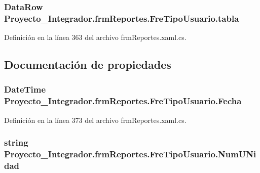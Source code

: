 \subsubsection[{tabla}]{\setlength{\rightskip}{0pt plus 5cm}Data\-Row Proyecto\-\_\-\-Integrador.\-frm\-Reportes.\-Fre\-Tipo\-Usuario.\-tabla}\label{struct_proyecto___integrador_1_1frm_reportes_1_1_fre_tipo_usuario_a0bc2763503284cfde519abe7c04de714}


Definición en la línea 363 del archivo frm\-Reportes.\-xaml.\-cs.



\subsection{Documentación de propiedades}
\subsubsection[{Fecha}]{\setlength{\rightskip}{0pt plus 5cm}Date\-Time Proyecto\-\_\-\-Integrador.\-frm\-Reportes.\-Fre\-Tipo\-Usuario.\-Fecha\hspace{0.3cm}{\ttfamily [get]}}\label{struct_proyecto___integrador_1_1frm_reportes_1_1_fre_tipo_usuario_a84a0c50f074fb80cb363316c9d25468d}


Definición en la línea 373 del archivo frm\-Reportes.\-xaml.\-cs.

\subsubsection[{Num\-U\-Nidad}]{\setlength{\rightskip}{0pt plus 5cm}string Proyecto\-\_\-\-Integrador.\-frm\-Reportes.\-Fre\-Tipo\-Usuario.\-Num\-U\-Nidad\hspace{0.3cm}{\ttfamily [get]}}\label{struct_proyecto___integrador_1_1frm_reportes_1_1_fre_tipo_usuario_a6c0ad28bb568f4df1b97ae8d33ef38fb}



